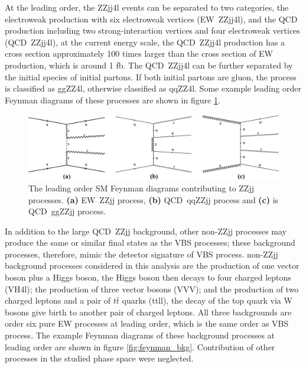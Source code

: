 \documentclass[a4paper,12pt]{article}
\begin{document}
			\par At the leading order, the ZZjj4l events can be separated to two categories, the electroweak production with six
			electroweak vertices (EW\ ZZjj4l), and the QCD production including two strong-interaction vertices and four electroweak
			vertices (QCD\ ZZjj4l), at the current energy scale, the QCD\ ZZjj4l production has a cross section approximately 100 
			times larger than the cross section of EW production, which is around 1 fb. The QCD\ ZZjj4l can be further separated by the
			initial species of initial partons. If both initial partons are gluon, the process is classified as ggZZ4l, 
			otherwise classified as qqZZ4l. Some example leading order Feynman diagrams of these processes are shown in figure \ref{fig:feynman}.
			\begin{figure}[ht]
				\begin{centering}
				\includegraphics[scale=0.42]{figures/feynman.png}
				\caption{The leading order SM Feynman diagrams contributing to ZZjj processes. \textbf{(a)} EW\ ZZjj process, \textbf{(b)} QCD\ qqZZjj process and \textbf{(c)} is QCD\ ggZZjj process.}
				\label{fig:feynman}
				\end{centering}
			\end{figure}
			\par In addition to the large QCD\ ZZjj background, other non-ZZjj processes may produce the same or similar final states as the VBS processes; 
			these background processes, therefore, mimic the detector signature of VBS process. non-ZZjj background processes  
			considered in this analysis are the production of one vector boson plus a Higgs boson, the Higgs boson then decays to four
			charged leptons (VH4l); the production of three vector bosons (VVV); and the production of two charged leptons and a 
			pair of $t\bar{t}$ quarks (ttll),  the decay of the top quark via W bosons give birth to another pair of charged leptons. 
			All three backgrounds are order six pure EW processes at leading order, which is the same order as VBS process. The 
			example Feynman diagrams of these background processes at leading order are shown in figure \ref{fig:feynman_bkg}. 
			Contribution of other processes in the studied phase space were neglected. 
\end{document}
